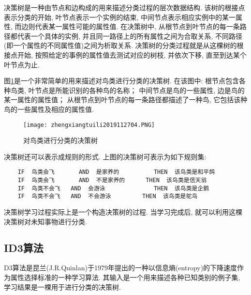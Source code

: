 决策树是一种由节点和边构成的用来描述分类过程的层次数据结构. 该树的根接点表示分类的开始, 叶节点表示一个实例的结束, 中间节点表示相应实例中的某一属性, 而边则代表某一属性可能的属性值.
在决策树中, 从根节点到叶节点的每一条路径都代表一个具体的实例, 并且同一路径上的所有属性之间为合取关系, 不同路径(即一个属性的不同属性值)之间为析取关系.
决策树的分类过程就是从这棵树的根接点开始, 按照给定的事例的属性值去测试对应的树枝, 并依次下移, 直至到达某个叶节点为止.

图\ref{AI32fig2704}是一个非常简单的用来描述对鸟类进行分类的决策树.
在该图中: 根节点包含各种鸟类, 叶节点是所能识别的各种鸟的名称； 中间节点是鸟的一些属性, 边是鸟的某一属性的属性值； 从根节点到叶节点的每一条路径都描述了一种鸟, 它包括该种鸟的一些属性及相应的属性值.
\begin{figure}[H]
\centering
\texttt{[image: zhengxiangtuili2019112704.PNG]}
\caption{对鸟类进行分类的决策树}
\label{AI32fig2704}
\end{figure}
 决策树还可以表示成规则的形式. 上图的决策树可表示为如下规则集:
\begin{Verbatim}
    IF  鸟类会飞       AND  是家养的          THEN  该鸟类是和平鸽
    IF  鸟类会飞       AND  不是家养的      THEN  该鸟类是信天翁
    IF  鸟类不会飞   AND  会游泳              THEN  该鸟类是企鹅
    IF  鸟类不会飞   AND  不会游泳         THEN  该鸟类是鸵鸟
\end{Verbatim}

决策树学习过程实际上是一个构造决策树的过程. 当学习完成后, 就可以利用这棵决策树对未知事物进行分类.
\subsection{ID3算法}
D3算法是昆兰(J.R.Quinlan)于1979年提出的一种以信息熵(entropy)的下降速度作为属性选择标准的一种学习算法. 其输入是一个用来描述各种已知类别的例子集, 学习结果是一棵用于进行分类的决策树.

